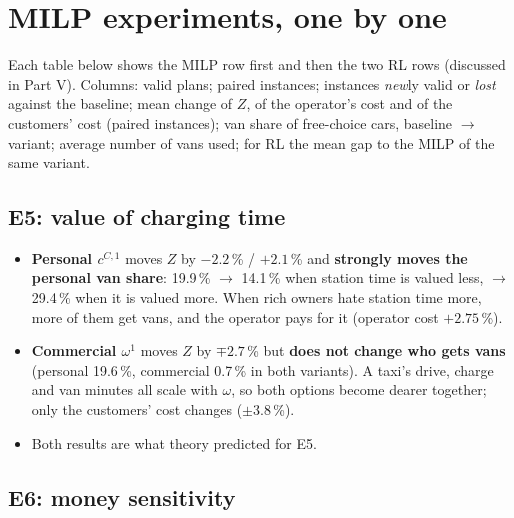 \section{MILP experiments, one by one}
\label{sec:milpexp}

Each table below shows the MILP row first and then the two RL rows (discussed in Part V). Columns: valid plans; paired instances; instances \emph{new}ly valid or \emph{lost} against the baseline; mean change of $Z$, of the operator's cost and of the customers' cost (paired instances); van share of free-choice cars, baseline $\to$ variant; average number of vans used; for RL the mean gap to the MILP of the same variant.

\subsection{E5: value of charging time}

\begin{table}[H]
\centering
\caption{E5. Value of a station minute for the richest private owner ($c^{C,1}$), and the commercial downtime rate at the top income ($\omega^1$), $\pm25$\,\%.}

\end{table}

\begin{itemize}
  \item \textbf{Personal $c^{C,1}$} moves $Z$ by $-2.2$\,\% / $+2.1$\,\% and \textbf{strongly moves the personal van share}: 19.9\,\% $\to$ 14.1\,\% when station time is valued less, $\to$ 29.4\,\% when it is valued more. When rich owners hate station time more, more of them get vans, and the operator pays for it (operator cost $+2.75$\,\%).
  \item \textbf{Commercial $\omega^1$} moves $Z$ by $\mp2.7$\,\% but \textbf{does not change who gets vans} (personal 19.6\,\%, commercial 0.7\,\% in both variants). A taxi's drive, charge and van minutes all scale with $\omega$, so both options become dearer together; only the customers' cost changes ($\pm3.8$\,\%).
  \item Both results are what theory predicted for E5.
\end{itemize}


\subsection{E6: money sensitivity}

